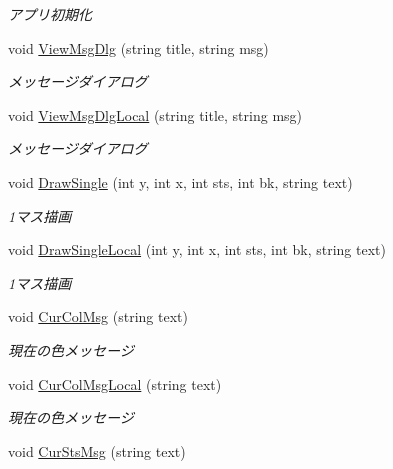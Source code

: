 \begin{DoxyCompactItemize}
\begin{DoxyCompactList}\small\item\em アプリ初期化 \end{DoxyCompactList}\item 
void \hyperlink{class_reversi4color_wpf_1_1_main_window_a831a8cf1b728a5a24904633e707068bd}{View\+Msg\+Dlg} (string title, string msg)
\begin{DoxyCompactList}\small\item\em メッセージダイアログ \end{DoxyCompactList}\item 
void \hyperlink{class_reversi4color_wpf_1_1_main_window_ab27e29687aa1b84ddac23a0c68fcfa56}{View\+Msg\+Dlg\+Local} (string title, string msg)
\begin{DoxyCompactList}\small\item\em メッセージダイアログ \end{DoxyCompactList}\item 
void \hyperlink{class_reversi4color_wpf_1_1_main_window_a423004ac78eb7b105b4cbd4d80a56f15}{Draw\+Single} (int y, int x, int sts, int bk, string text)
\begin{DoxyCompactList}\small\item\em 1マス描画 \end{DoxyCompactList}\item 
void \hyperlink{class_reversi4color_wpf_1_1_main_window_a80586da2db47e13ae408b974b3e9f2cc}{Draw\+Single\+Local} (int y, int x, int sts, int bk, string text)
\begin{DoxyCompactList}\small\item\em 1マス描画 \end{DoxyCompactList}\item 
void \hyperlink{class_reversi4color_wpf_1_1_main_window_ab2c7405df589c397f20edfd497f8b055}{Cur\+Col\+Msg} (string text)
\begin{DoxyCompactList}\small\item\em 現在の色メッセージ \end{DoxyCompactList}\item 
void \hyperlink{class_reversi4color_wpf_1_1_main_window_a95f83a9cd4af4893c6fe2b84d717b92c}{Cur\+Col\+Msg\+Local} (string text)
\begin{DoxyCompactList}\small\item\em 現在の色メッセージ \end{DoxyCompactList}\item 
void \hyperlink{class_reversi4color_wpf_1_1_main_window_a5aacc83414f6c239899ee02e2ee8d9df}{Cur\+Sts\+Msg} (string text)

\end{DoxyCompactItemize}
